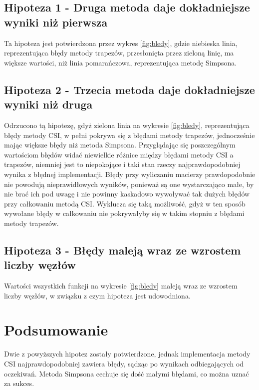 \documentclass{article}
\begin{document}
\subsection{Hipoteza 1 - Druga metoda daje dokładniejsze wyniki niż pierwsza }

Ta hipoteza jest potwierdzona przez wykres \ref{fig:bledy}, gdzie niebieska linia, reprezentująca błędy metody trapezów, przesłonięta przez zieloną linię, ma większe wartości, niż linia pomarańczowa, reprezentująca metodę Simpsona.

\subsection{Hipoteza 2 - Trzecia metoda daje dokładniejsze wyniki niż druga }

Odrzucono tą hipotezę, gdyż zielona linia na wykresie \ref{fig:bledy}, reprezentująca błędy metody CSI, w pełni pokrywa się z błędami metody trapezów, jednocześnie mając większe błędy niż metoda Simpsona. Przyglądając się poszczególnym wartościom błędów widać niewielkie różnice między błędami metody CSI a trapezów, niemniej jest to niepokojące i taki stan rzeczy najprawdopodobniej wynika z błędnej implementacji. Błędy przy wyliczaniu macierzy prawdopodobnie nie powodują nieprawidłowych wyników, ponieważ są one wystarczająco małe, by nie brać ich pod uwagę i nie powinny kaskadowo wywoływać tak dużych błędów przy całkowaniu metodą CSI. Wyklucza się taką możliwość, gdyż w ten sposób wywołane błędy w całkowaniu nie pokrywałyby się w takim stopniu z błędami metody trapezów.

\subsection{Hipoteza 3 - Błędy maleją wraz ze wzrostem liczby węzłów}

Wartości wszystkich funkcji na wykresie \ref{fig:bledy} maleją wraz ze wzrostem liczby węzłów, w związku z czym hipoteza jest udowodniona.

\section{Podsumowanie}

Dwie z powyższych hipotez zostały potwierdzone, jednak implementacja metody CSI najprawdopodobniej zawiera błędy, sądząc po wynikach odbiegających od oczekiwań. Metoda Simpsona cechuje się dość małymi błędami, co można uznać za sukces.
\end{document}
